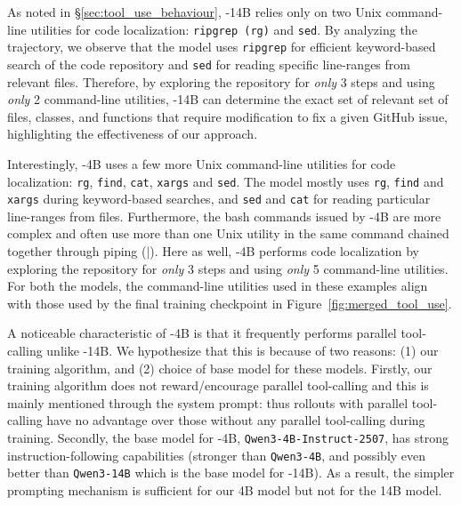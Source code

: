 As noted in \S\ref{sec:tool_use_behaviour}, \methodname-14B relies only on two Unix command-line utilities for code localization: \texttt{ripgrep (rg)} and \texttt{sed}. By analyzing the trajectory, we observe that the model uses \texttt{ripgrep} for efficient keyword-based search of the code repository and \texttt{sed} for reading specific line-ranges from relevant files. Therefore, by exploring the repository for \emph{only} 3 steps and using \emph{only} 2 command-line utilities, \methodname-14B can determine the exact set of relevant set of files, classes, and functions that require modification to fix a given GitHub issue, highlighting the effectiveness of our approach.

Interestingly, \methodname-4B uses a few more Unix command-line utilities for code localization: \texttt{rg}, \texttt{find}, \texttt{cat}, \texttt{xargs} and \texttt{sed}. The model mostly uses \texttt{rg}, \texttt{find} and \texttt{xargs} during keyword-based searches, and \texttt{sed} and \texttt{cat} for reading particular line-ranges from files. Furthermore, the bash commands issued by \methodname-4B are more complex and often use more than one Unix utility in the same command chained together through piping ($|$). Here as well, \methodname-4B performs code localization by exploring the repository for \emph{only} 3 steps and using \emph{only} 5 command-line utilities. For both the models, the command-line utilities used in these examples align with those used by the final training checkpoint in Figure~\ref{fig:merged_tool_use}.


A noticeable characteristic of \methodname-4B is that it frequently performs parallel tool-calling unlike \methodname-14B. We hypothesize that this is because of two reasons: (1) our training algorithm, and (2) choice of base model for these models. Firstly, our training algorithm does not reward/encourage parallel tool-calling and this is mainly mentioned through the system prompt: thus rollouts with parallel tool-calling have no advantage over those without any parallel tool-calling during training. Secondly, the base model for \methodname-4B, \texttt{Qwen3-4B-Instruct-2507}, has strong instruction-following capabilities (stronger than \texttt{Qwen3-4B}, and possibly even better than \texttt{Qwen3-14B} which is the base model for \methodname-14B). As a result, the simpler prompting mechanism is sufficient for our 4B model but not for the 14B model.

